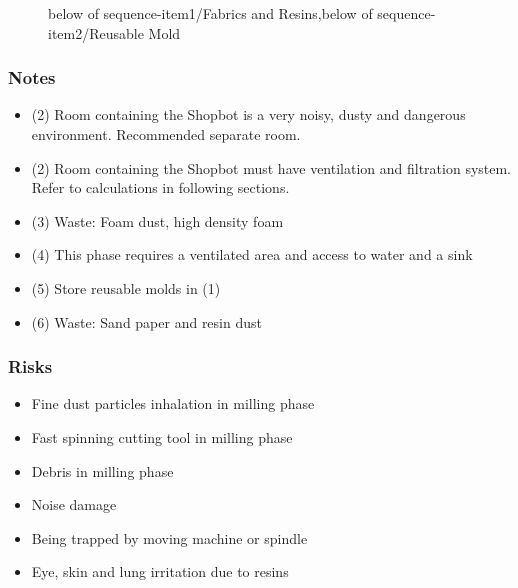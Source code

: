 \documentclass[a4paper,12pt,titlepage]{article}
\begin{document}
\begin{figure}[h]

\centering
{}
{below of sequence-item1/{Fabrics and Resins},below of sequence-item2/Reusable Mold}
\vspace{1cm}
\end{figure}


\subsubsection*{Notes}
\begin{itemize}
\item (2) Room containing the Shopbot is a very noisy, dusty and dangerous environment. Recommended separate room.
\item (2) Room containing the Shopbot must have ventilation and filtration system. Refer to calculations in following sections.
\item (3) Waste: Foam dust, high density foam
\item (4) This phase requires a ventilated area and access to water and a sink
\item (5) Store reusable molds in (1)
\item (6) Waste: Sand paper and resin dust
\end{itemize}
\subsubsection*{Risks}
\begin{itemize}
\item Fine dust particles inhalation in milling phase
\item Fast spinning cutting tool in milling phase
\item Debris in milling phase
\item Noise damage
\item Being trapped by moving machine or spindle
\item Eye, skin and lung irritation due to resins
\end{itemize}
\end{document}
